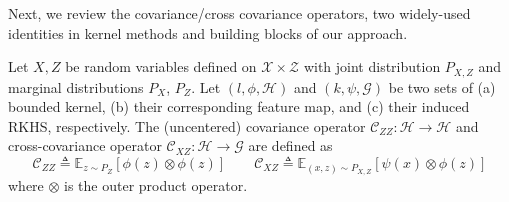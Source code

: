 Next, we review the covariance/cross covariance operators, two widely-used identities in kernel methods \citep{fukumizu2013kernel,song2013kernel} and building blocks of our approach.
\begin{definition}
    Let $X, Z$ be random variables defined on $\mathcal{X} \times \mathcal{Z}$ with joint distribution $P_{X, Z}$ and marginal distributions $P_{X}$, $P_{Z}$. Let $(l, \phi, \mathcal{H})$ and $(k, \psi, \mathcal{G})$ be two sets of (a) bounded kernel, (b) their corresponding feature map, and (c) their induced RKHS, respectively. The (uncentered) covariance operator $\mathcal{C}_{ZZ}: \mathcal{H} \to \mathcal{H}$ and cross-covariance operator $\mathcal{C}_{XZ}: \mathcal{H} \to \mathcal{G}$ are defined as 
    \begin{equation}
        \mathcal{C}_{ZZ} \triangleq \mathbb{E}_{z \sim P_Z}[\phi(z) \otimes \phi(z)]\qquad \mathcal{C}_{XZ} \triangleq \mathbb{E}_{(x, z) \sim P_{X, Z}}[\psi(x) \otimes \phi(z)]
    \end{equation}
    where $\otimes$ is the outer product operator.
\end{definition}


